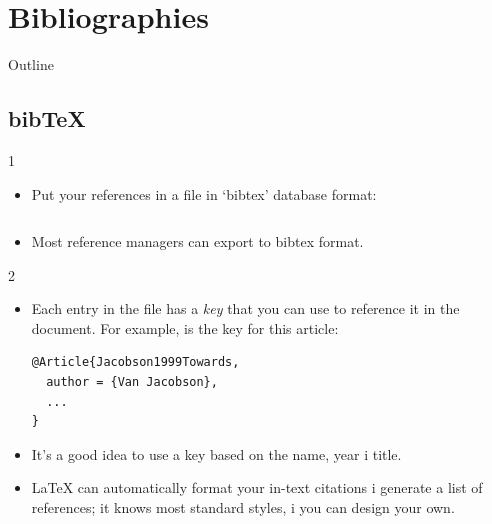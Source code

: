 \documentclass{beamer}
\begin{document}
\section{Bibliographies}

\begin{frame}{Outline}
\begin{multicols}{2}
\tableofcontents[currentsection]
\end{multicols}
\end{frame}

\subsection{bib\TeX}
\begin{frame}[fragile]{\insertsubsection{} 1}
\begin{itemize}
\item Put your references in a  file in `bibtex' database format:
\inputminted[fontsize=\scriptsize,frame=single]{latex}{bib-example.bib}
\item Most reference managers can export to bibtex format.
\end{itemize}
\end{frame}

\begin{frame}[fragile]{\insertsubsection{} 2}
\begin{itemize}
\item Each entry in the  file has a \emph{key} that you can use to
reference it in the document. For example,  is the key for this article:
\begin{verbatim}
@Article{Jacobson1999Towards,
  author = {Van Jacobson},
  ...
}
\end{verbatim}
\item It's a good idea to use a key based on the name, year i title.
\item \LaTeX{} can automatically format your in-text citations i generate a
list of references; it knows most standard styles, i you can design your own.
\end{itemize}
\end{frame}
\end{document}

